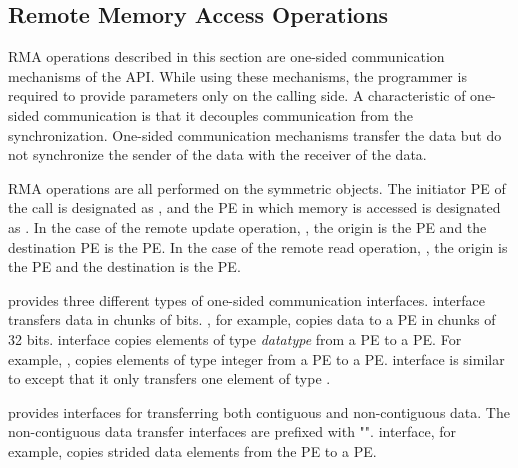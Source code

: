 \subsection{Remote Memory Access Operations}
\label{sec:rma}
\ac{RMA} operations described in this section are one-sided communication
mechanisms of the \openshmem{} \ac{API}. While 
using these mechanisms, the programmer is required to provide parameters
only on the calling side. A characteristic of one-sided communication 
is that it decouples communication from
the synchronization. One-sided communication mechanisms transfer 
the data but do not synchronize the sender of the data with the receiver
of the data. 

\openshmem{} \ac{RMA} operations are all performed on the symmetric objects. 
The initiator \ac{PE} of the call is designated as \source{}, and the 
\ac{PE} in which memory is accessed is designated as \target{}. In the case of the remote
update operation, \PUT{}, the origin is the \source{} \ac{PE} and the 
destination \ac{PE} is the \target{} PE. In the case of the remote read operation, \GET{}, 
the origin is the \target{} \ac{PE} and the destination is the \source{} \ac{PE}.

\openshmem{} provides three different types of one-sided communication interfaces. 
 interface transfers data in chunks 
of bits. , for example, copies data to a \target{} \ac{PE} in chunks of 
32 bits.  interface copies elements of type 
\textit{datatype} from a \source{} \ac{PE} to a \target{} \ac{PE}. 
For example, , copies elements
of type integer from a \source{} \ac{PE} to a \target{} \ac{PE}. 
 interface is similar to  
except that it only transfers one element of type .

\openshmem{} provides interfaces for transferring both contiguous and 
non-contiguous data. The non-contiguous data transfer interfaces are prefixed 
with "".  interface, for example, copies strided
data elements from the \source{} \ac{PE} to a \target{} \ac{PE}. 


